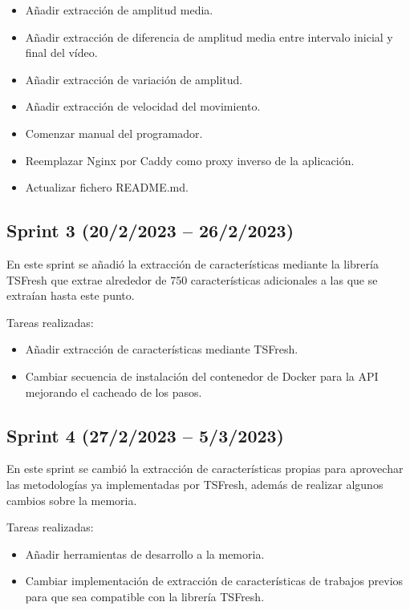 \begin{itemize}
    \item Añadir extracción de amplitud media.
    \item Añadir extracción de diferencia de amplitud media entre intervalo
          inicial y final del vídeo.
    \item Añadir extracción de variación de amplitud.
    \item Añadir extracción de velocidad del movimiento.
    \item Comenzar manual del programador.
    \item Reemplazar Nginx por Caddy como proxy inverso de la aplicación.
    \item Actualizar fichero README.md.
\end{itemize}

\subsection{Sprint 3 (20/2/2023 -- 26/2/2023)}

En este sprint se añadió la extracción de características mediante la librería
TSFresh \cite{christ2018time} que extrae alrededor de 750 características
adicionales a las que se extraían hasta este punto.

Tareas realizadas:

\begin{itemize}
    \item Añadir extracción de características mediante TSFresh.
    \item Cambiar secuencia de instalación del contenedor de Docker para la API
          mejorando el cacheado de los pasos.
\end{itemize}

\subsection{Sprint 4 (27/2/2023 -- 5/3/2023)}

En este sprint se cambió la extracción de características propias para
aprovechar las metodologías ya implementadas por TSFresh, además de realizar
algunos cambios sobre la memoria.

Tareas realizadas:

\begin{itemize}
    \item Añadir herramientas de desarrollo a la memoria.
    \item Cambiar implementación de extracción de características de trabajos
          previos para que sea compatible con la librería TSFresh.
\end{itemize}

